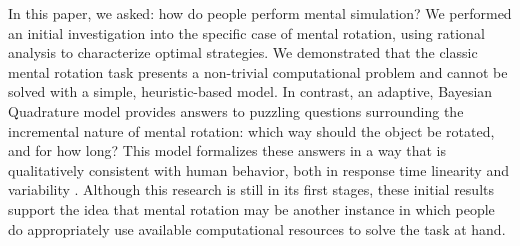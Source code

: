 \documentclass{article} %
\begin{document}
In this paper, we asked: how do people perform mental simulation?  We
performed an initial investigation into the specific case of mental
rotation, using rational analysis to characterize optimal strategies.
We demonstrated that the classic mental rotation task
\cite{Shepard1971} presents a non-trivial computational problem and
cannot be solved with a simple, heuristic-based model. In contrast, an
adaptive, Bayesian Quadrature model provides answers to puzzling
questions surrounding the incremental nature of mental rotation: which
way should the object be rotated, and for how long? This model
formalizes these answers in a way that is qualitatively consistent
with human behavior, both in response time linearity
\cite{Shepard1971} and variability \cite{Just1976}. Although this
research is still in its first stages, these initial results support
the idea that mental rotation may be another instance in which people
do appropriately use available computational resources to solve the
task at hand.


\renewcommand\refname{\normalsize{References}}

{\small }
\end{document}
